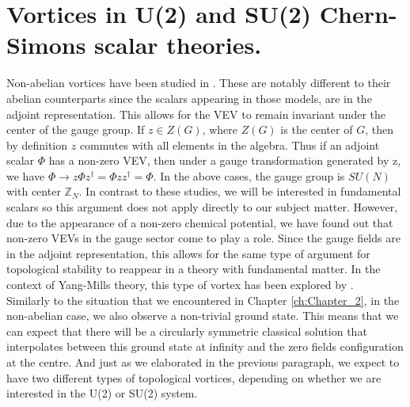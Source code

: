 
    \graphicspath{{Background_Folder/figures/PNG/}{Background_Folder/figures/PDF/}{Background_Folder/figures/}}

\chapter{Vortices in U(2) and SU(2) Chern-Simons scalar theories.}



Non-abelian vortices have been studied in \cite{deVega1986, Kumar1986, 1306.5146, NavarroLrida2010}. These are notably different to their abelian counterparts since the scalars appearing in those models, are in the adjoint representation. This allows for the VEV to remain invariant under the center of the gauge group. If $z\in Z(G)$, where $Z(G)$ is the center of $G$, then by definition $z$ commutes with all elements in the algebra. Thus if an adjoint scalar $\Phi$ has a non-zero VEV, then under a gauge transformation generated by z, we have $\Phi \rightarrow z\Phi z^{\dag} =\Phi z z^{\dag} = \Phi$. In the above cases, the gauge group is $SU(N)$ with center $\mathbb{Z}_N$. In contrast to these studies, we will be interested in fundamental scalars so this argument does not apply directly to our subject matter. However, due to the appearance of a non-zero chemical potential, we have found out that non-zero VEVs in the gauge sector come to play a role. Since the gauge fields are in the adjoint representation, this allows for the same type of argument for topological stability to reappear in a theory with fundamental matter. In the context of Yang-Mills theory, this type of vortex has been explored by \cite{hep-ph/0512203}.\\  
\indent Similarly to the situation that we encountered in Chapter \ref{ch:Chapter_2}, in the non-abelian case, we also observe a non-trivial ground state. This means that we can expect that there will be a circularly symmetric classical solution that interpolates between this ground state at infinity and the zero fields configuration at the centre. And just as we elaborated in the previous paragraph, we expect to have two different types of topological vortices, depending on whether we are interested in the U(2) or SU(2) system.




